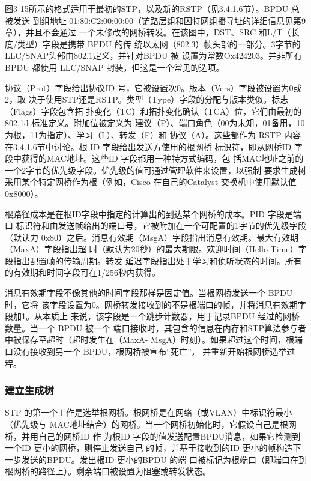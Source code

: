 图3-15所示的格式适用于最初的STP，以及新的RSTP（见3.4.1.6节）。BPDU 总被发送
到组地址 01:80:C2:00:00:00（链路层组和因特网组播寻址的详细信息见第9章），并且不会通过
一个未修改的网桥转发。在该图中，DST、SRC 和L/T（长度/类型）字段是携带 BPDU 的传
统以太网（802.3）帧头部的一部分。3字节的LLC/SNAP头部由802.1定义，并针对BPDU 被
设置为常数Ox424203。并非所有BPDU 都使用 LLC/SNAP 封装，但这是一个常见的选项。

协议（Prot）字段给出协议ID 号，它被设置次0。版本（Vers）字段被设置为0或2，取
决于使用STP还是RSTP。类型（Type）字段的分配与版本类似。标志（Flags）字段包含拓
扑变化（TC）和拓扑变化确认（TCA）位，它们由最初的802.1d 标准定义。附加位被定义为
建议（P）、端口角色（00为未知，01备用，10为根，11为指定）、学习（L）、转发（F）和
协议（A）。这些都作为 RSTP 内容在3.4.1.6节中讨论。根 ID 字段给出发送方使用的根网桥
标识符，即从网桥ID 字段中获得的MAC地址。这些ID 字段都用一种特方式编码，包
括MAC地址之前的一个2字节的优先级字段。优先级的值可通过管理软件来设置，以强制
要求生成树采用某个特定网桥作为根（例如，Cisco 在自己的Catalyst 交换机中使用默认值
0x8000）。

根路径成本是在根ID字段中指定的计算出的到达某个网桥的成本。PID 字段是端口
标识符和由发送帧给出的端口号，它被附加在一个可配置的1字节的优先级字段（默认力
0x80）之后。消息有效期（MsgA）字段指出消息有效期。最大有效期（MaxA）字段指出超
时（默认为20秒）的最大期限。欢迎时间（Hello Time）字段指出配置帧的传输周期。转发
延迟字段指出处于学习和侦听状态的时间。所有的有效期和时间字段可在1/256秒内获得。

消息有效期字段不像其他的时间字段那样是固定值。当根网桥发送一个 BPDU时，它将
该字段设置为0。网桥转发接收到的不是根端口的帧，并将消息有效期字段加1。从本质上
来说，该字段是一个跳步计数器，用于记录BPDU 经过的网桥数量。当一个 BPDU 被一个
端口接收时，其包含的信息在内存和STP算法参与者中被保存至超时（超时发生在（MaxA-
MsgA）时刻）。如果超过这个时间，根端口没有接收到另一个 BPDU，根网桥被宣布“死亡”，
并重新开始根网桥选举过程。

\subsubsection{建立生成树}

STP 的第一个工作是选举根网桥。根网桥是在网络（或VLAN）中标识符最小（优先级与
MAC地址结合）的网桥。当一个网桥初始化时，它假设自己是根网桥，并用自己的网桥ID 作
为根ID 字段的值发送配置BPDU消息，如果它检测到一个ID 更小的网桥，则停止发送自己
的帧，并基于接收到的ID 更小的帧构造下一步发送的BPDU。发出根ID 更小的BPDU 的端
口被标记为根端口（即端口在到根网桥的路径上）。剩余端口被设置为阻塞或转发状态。

